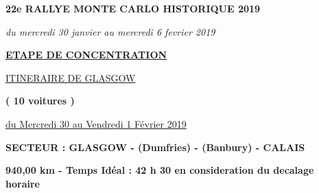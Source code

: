 \documentclass{article}%
\begin{document}
%
\normalsize%
\begin{center} \textbf{\LARGE{22e RALLYE MONTE CARLO HISTORIQUE 2019}} \end{center}%
\begin{center} \textit{du mercredi 30 janvier au mercredi 6 fevrier 2019} \end{center}%
\begin{center} \textbf{\underline{ETAPE DE CONCENTRATION}} \end{center}%
\begin{center} \underline{ITINERAIRE DE GLASGOW} \end{center}%
\begin{center} \textbf{( 10 voitures )} \end{center}%
\begin{flushright} \underline{du Mercredi 30 au Vendredi 1 Février 2019} \end{flushright}%
\begin{flushleft} \textbf{SECTEUR : GLASGOW  - (Dumfries) - (Banbury) - CALAIS} \end{flushleft}%
\begin{flushright} \textbf{940,00 km - Temps Idéal : 42 h 30 en consideration du decalage horaire} \end{flushright}%
\end{document}
